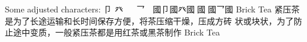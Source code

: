 
\begin{multicols}{2}
Some adjusted characters:
{\cn{}卩}
{\cnxBabel{}癶}
{\cnxJzr{}}
{\cnxJzr{}}
{\cn{}乛}
{\cnxJzr{}}
{\cn{}國}{\cn{}卩}{\cn{}國}{\cnxBabel{}癶}{\cn{}國}{\cnxJzr{}}{\cn{}國}{\cnxJzr{}}{\cn{}國}{\cn{}乛}{\cn{}國} Brick Tea {\cn{}紧压茶是为了长途运输和长时间保存方便，将茶压缩干燥，压成方砖}
{\cn{}状或块状，为了防止途中变质，一般紧压茶都是用红茶或黑茶制作} Brick Tea
\end{multicols}
